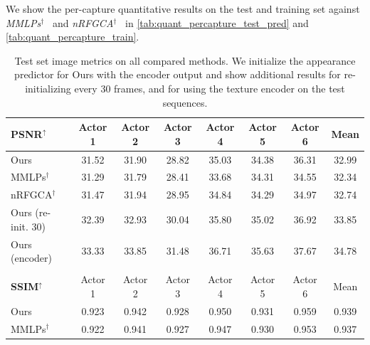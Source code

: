 \documentclass[runningheads]{llncs}
\begin{document}
We show the per-capture quantitative results on the test and training set against \emph{MMLPs$^\dagger$}~\cite{zhan2025spatialmlps} and \emph{nRFGCA$^\dagger$}~\cite{wang2025relightable} in \cref{tab:quant_percapture_test_pred} and \cref{tab:quant_percapture_train}.

\begin{table}[!h]
    \centering
    \scriptsize
    \caption{Test set image metrics on all compared methods. We initialize the appearance predictor for Ours with the encoder output and show additional results for re-initializing every 30 frames, and for using the texture encoder on the test sequences.}
    \setlength{\tabcolsep}{3pt}
\begin{tabular}{lcccccc|c}
\textbf{PSNR$^\uparrow$} & Actor 1 & Actor 2 & Actor 3 & Actor 4 & Actor 5 & Actor 6 & Mean \\ \hline
Ours & \cellcolor{best!40}31.52 & \cellcolor{best!15}31.90 & \cellcolor{best!15}28.82 & \cellcolor{best!40}35.03 & \cellcolor{best!40}34.38 & \cellcolor{best!40}36.31 & \cellcolor{best!40}32.99 \\
MMLPs$^\dagger$ & \cellcolor{best!00}31.29 & \cellcolor{best!00}31.79 & \cellcolor{best!00}28.41 & \cellcolor{best!00}33.68 & \cellcolor{best!15}34.31 & \cellcolor{best!00}34.55 & \cellcolor{best!00}32.34 \\
nRFGCA$^\dagger$ & \cellcolor{best!15}31.47 & \cellcolor{best!40}31.94 & \cellcolor{best!40}28.95 & \cellcolor{best!15}34.84 & \cellcolor{best!00}34.29 & \cellcolor{best!15}34.97 & \cellcolor{best!15}32.74 \\ \hline
Ours (re-init. 30) & \cellcolor{best!00}32.39 & \cellcolor{best!00}32.93 & \cellcolor{best!00}30.04 & \cellcolor{best!00}35.80 & \cellcolor{best!00}35.02 & \cellcolor{best!00}36.92 & \cellcolor{best!00}33.85 \\
Ours (encoder) & \cellcolor{best!00}33.33 & \cellcolor{best!00}33.85 & \cellcolor{best!00}31.48 & \cellcolor{best!00}36.71 & \cellcolor{best!00}35.63 & \cellcolor{best!00}37.67 & \cellcolor{best!00}34.78 \\
\\
\textbf{SSIM$^\uparrow$} & Actor 1 & Actor 2 & Actor 3 & Actor 4 & Actor 5 & Actor 6 & Mean \\ \hline
Ours & \cellcolor{best!15}0.923 & \cellcolor{best!40}0.942 & \cellcolor{best!15}0.928 & \cellcolor{best!40}0.950 & \cellcolor{best!15}0.931 & \cellcolor{best!40}0.959 & \cellcolor{best!40}0.939 \\
MMLPs$^\dagger$ & \cellcolor{best!00}0.922 & \cellcolor{best!00}0.941 & \cellcolor{best!00}0.927 & \cellcolor{best!00}0.947 & \cellcolor{best!00}0.930 & \cellcolor{best!00}0.953 & \cellcolor{best!00}0.937 \\

\end{tabular}
\end{table}
\end{document}
